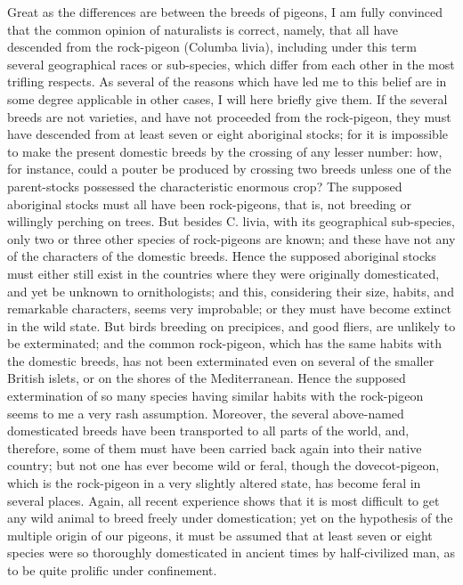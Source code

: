 \indent Great as the differences are between the breeds of pigeons, I am fully convinced that the common opinion of naturalists is correct, namely, that all have descended from the rock-pigeon (Columba livia), including under this term several geographical races or sub-species, which differ from each other in the most trifling respects. As several of the reasons which have led me to this belief are in some degree applicable in other cases, I will here briefly give them. If the several breeds are not varieties, and have not proceeded from the rock-pigeon, they must have descended from at least seven or eight aboriginal stocks; for it is impossible to make the present domestic breeds by the crossing of any lesser number: how, for instance, could a pouter be produced by crossing two breeds unless one of the parent-stocks possessed the characteristic enormous crop?  The supposed aboriginal stocks must all have been rock-pigeons, that is, not breeding or willingly perching on trees. But besides C. livia, with its geographical sub-species, only two or three other species of rock-pigeons are known; and these have not any of the characters of the domestic breeds. Hence the supposed aboriginal stocks must either still exist in the countries where they were originally domesticated, and yet be unknown to ornithologists; and this, considering their size, habits, and remarkable characters, seems very improbable; or they must have become extinct in the wild state. But birds breeding on precipices, and good fliers, are unlikely to be exterminated; and the common rock-pigeon, which has the same habits with the domestic breeds, has not been exterminated even on several of the smaller British islets, or on the shores of the Mediterranean. Hence the supposed extermination of so many species having similar habits with the rock-pigeon seems to me a very rash assumption.  Moreover, the several above-named domesticated breeds have been transported to all parts of the world, and, therefore, some of them must have been carried back again into their native country; but not one has ever become wild or feral, though the dovecot-pigeon, which is the rock-pigeon in a very slightly altered state, has become feral in several places. Again, all recent experience shows that it is most difficult to get any wild animal to breed freely under domestication; yet on the hypothesis of the multiple origin of our pigeons, it must be assumed that at least seven or eight species were so thoroughly domesticated in ancient times by half-civilized man, as to be quite prolific under confinement.  \\
